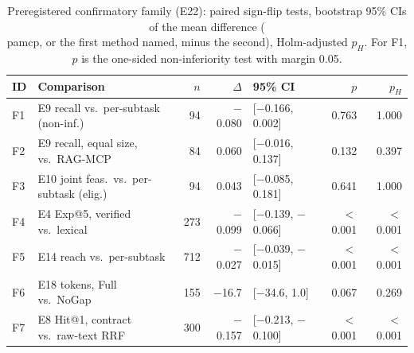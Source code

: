 \begin{table}[t]
\caption{Preregistered confirmatory family (E22): paired sign-flip tests, bootstrap 95\% CIs of the mean
difference (\\pamcp{}, or the first method named, minus the second), Holm-adjusted $p_H$. For F1, $p$ is the one-sided
non-inferiority test with margin 0.05.}
\label{tab:ev-family}
\centering\footnotesize\setlength{\tabcolsep}{1.8pt}
\begin{tabular}{@{}lp{2.6cm}rrlrr@{}}
\toprule
ID & Comparison & $n$ & $\Delta$ & 95\% CI & $p$ & $p_H$\\
\midrule
F1 & E9 recall vs.\ per-subtask (non-inf.) & 94 & $-$0.080 & [$-$0.166, 0.002] & 0.763 & 1.000\\
F2 & E9 recall, equal size, vs.\ RAG-MCP & 84 & 0.060 & [$-$0.016, 0.137] & 0.132 & 0.397\\
F3 & E10 joint feas.\ vs.\ per-subtask (elig.) & 94 & 0.043 & [$-$0.085, 0.181] & 0.641 & 1.000\\
F4 & E4 Exp@5, verified vs.\ lexical & 273 & $-$0.099 & [$-$0.139, $-$0.066] & $<$0.001 & $<$0.001\\
F5 & E14 reach vs.\ per-subtask & 712 & $-$0.027 & [$-$0.039, $-$0.015] & $<$0.001 & $<$0.001\\
F6 & E18 tokens, Full vs.\ NoGap & 155 & $-$16.7 & [$-$34.6, 1.0] & 0.067 & 0.269\\
F7 & E8 Hit@1, contract vs.\ raw-text RRF & 300 & $-$0.157 & [$-$0.213, $-$0.100] & $<$0.001 & $<$0.001\\
\bottomrule
\end{tabular}
\end{table}
